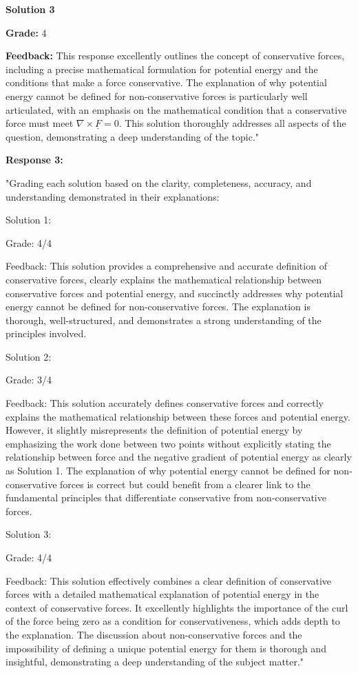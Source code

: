 \documentclass[a4paper,11pt]{article}
\begin{document}
\textbf{Solution 3}

\textbf{Grade:} 4

\textbf{Feedback:} This response excellently outlines the concept of conservative forces, including a precise mathematical formulation for potential energy and the conditions that make a force conservative. The explanation of why potential energy cannot be defined for non-conservative forces is particularly well articulated, with an emphasis on the mathematical condition that a conservative force must meet \(\nabla \times \underline{F} = 0\). This solution thoroughly addresses all aspects of the question, demonstrating a deep understanding of the topic."

\textbf{Response 3:}

"Grading each solution based on the clarity, completeness, accuracy, and understanding demonstrated in their explanations:

Solution 1:

Grade: 4/4

Feedback: This solution provides a comprehensive and accurate definition of conservative forces, clearly explains the mathematical relationship between conservative forces and potential energy, and succinctly addresses why potential energy cannot be defined for non-conservative forces. The explanation is thorough, well-structured, and demonstrates a strong understanding of the principles involved.

Solution 2:

Grade: 3/4

Feedback: This solution accurately defines conservative forces and correctly explains the mathematical relationship between these forces and potential energy. However, it slightly misrepresents the definition of potential energy by emphasizing the work done between two points without explicitly stating the relationship between force and the negative gradient of potential energy as clearly as Solution 1. The explanation of why potential energy cannot be defined for non-conservative forces is correct but could benefit from a clearer link to the fundamental principles that differentiate conservative from non-conservative forces.

Solution 3:

Grade: 4/4

Feedback: This solution effectively combines a clear definition of conservative forces with a detailed mathematical explanation of potential energy in the context of conservative forces. It excellently highlights the importance of the curl of the force being zero as a condition for conservativeness, which adds depth to the explanation. The discussion about non-conservative forces and the impossibility of defining a unique potential energy for them is thorough and insightful, demonstrating a deep understanding of the subject matter."
\end{document}
